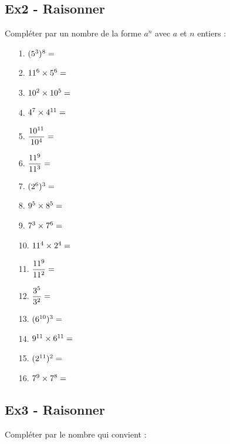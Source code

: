 \documentclass[12pt]{article}
\begin{document}
\subsection*{Ex2 - Raisonner}

Compléter par un nombre de la forme $a^n$ avec $a$ et $n$ entiers :

\begin{multicols}{4}
  \begin{enumerate}
  \item[1.] $(5^{3})^{8} = \dotfill$
  \item[2.] $11^{6} \times 5^{6}  =  \dotfill$
  \item[3.] $10^{2}\times10^{5} = \dotfill$
  \item[4.] $4^{7}\times4^{11} = \dotfill$
  \item[5.] $\dfrac{10^{11}}{10^{4}} = \dotfill$
  \item[6.] $\dfrac{11^{9}}{11^{3}} = \dotfill$
  \item[7.] $(2^{6})^{3} = \dotfill$
  \item[8.] $9^{5} \times 8^{5}  =  \dotfill$
  \item[9.] $7^{3}\times7^{6} = \dotfill$
  \item[10.] $11^{4} \times 2^{4}  =  \dotfill$
  \item[11.] $\dfrac{11^{9}}{11^{2}} = \dotfill$
  \item[12.] $\dfrac{3^{5}}{3^{2}} = \dotfill$
  \item[13.] $(6^{10})^{3} = \dotfill$
  \item[14.] $9^{11} \times 6^{11}  =  \dotfill$
  \item[15.] $(2^{11})^{2} = \dotfill$
  \item[16.] $7^{9}\times7^{8} = \dotfill$
  \end{enumerate}
\end{multicols}


\subsection*{Ex3 - Raisonner}

Compléter par le nombre qui convient :
\end{document}

